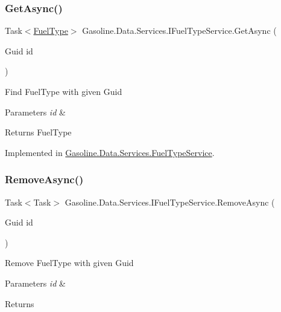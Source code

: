 \subsubsection{\texorpdfstring{GetAsync()}{GetAsync()}}
{\footnotesize\ttfamily Task$<$\mbox{\hyperlink{class_gasoline_1_1_data_1_1_models_1_1_fuel_type}{Fuel\+Type}}$>$ Gasoline.\+Data.\+Services.\+I\+Fuel\+Type\+Service.\+Get\+Async (\begin{DoxyParamCaption}\item[{Guid}]{id }\end{DoxyParamCaption})}



Find Fuel\+Type with given Guid 


\begin{DoxyParams}{Parameters}
{\em id} & \\
\hline
\end{DoxyParams}
\begin{DoxyReturn}{Returns}
Fuel\+Type
\end{DoxyReturn}


Implemented in \mbox{\hyperlink{class_gasoline_1_1_data_1_1_services_1_1_fuel_type_service_a9993b394d47b8cb7712fc526bf36e3e0}{Gasoline.\+Data.\+Services.\+Fuel\+Type\+Service}}.

\mbox{\label{interface_gasoline_1_1_data_1_1_services_1_1_i_fuel_type_service_adf2b22c96b7badbb188a3399eef01b0d}} 
\subsubsection{\texorpdfstring{RemoveAsync()}{RemoveAsync()}}
{\footnotesize\ttfamily Task$<$Task$>$ Gasoline.\+Data.\+Services.\+I\+Fuel\+Type\+Service.\+Remove\+Async (\begin{DoxyParamCaption}\item[{Guid}]{id }\end{DoxyParamCaption})}



Remove Fuel\+Type with given Guid 


\begin{DoxyParams}{Parameters}
{\em id} & \\
\hline
\end{DoxyParams}
\begin{DoxyReturn}{Returns}

\end{DoxyReturn}


